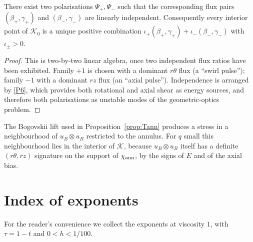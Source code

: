 \begin{lemma}
\label{lem:cone}
There exist two polarisations $\Psi_+,\Psi_-$ such that the corresponding flux pairs $(\beta_+,\gamma_+)$ and $(\beta_-,\gamma_-)$ are linearly independent. Consequently every interior point of $\mathcal K_0$ is a unique positive combination $\iota_+(\beta_+,\gamma_+)+\iota_-(\beta_-,\gamma_-)$ with $\iota_\pm>0$.
\end{lemma}

\begin{proof}
This is two-by-two linear algebra, once two independent flux ratios have been exhibited. Family $+1$ is chosen with a dominant $r\theta$ flux (a ``swirl pulse''); family $-1$ with a dominant $rz$ flux (an ``axial pulse''). Independence is arranged by \ref{P6}, which provides both rotational and axial shear as energy sources, and therefore both polarisations as unstable modes of the geometric-optics problem.
\end{proof}

The {B}ogovskii lift used in Proposition~\ref{prop:Tann} produces a stress in a neighbourhood of $u_B\otimes u_B$ restricted to the annulus. For $q$ small this neighbourhood lies in the interior of $\mathcal K$, because $u_B\otimes u_B$ itself has a definite $(r\theta,rz)$ signature on the support of $\chi_{\mathrm{ann}}$, by the signs of $E$ and of the axial bias.

\section{Index of exponents}
\label{app:exponents}

For the reader's convenience we collect the exponents at viscosity $1$, with $\tau=1-t$ and $0<h<1/100$.

